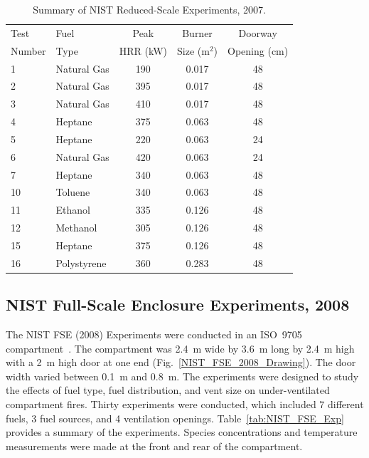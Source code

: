 \begin{table}[!ht]
\caption{Summary of NIST Reduced-Scale Experiments, 2007.}
\begin{center}
\begin{tabular}{|l|l|c|c|c|}
\hline
Test   &  Fuel         &  Peak        &  Burner       &  Doorway          \\
Number &  Type         &  HRR (kW)    &  Size (m$^2$) &  Opening (cm)     \\ \hline \hline
1      &  Natural Gas  &  190         &  0.017        &  48               \\ \hline
2      &  Natural Gas  &  395         &  0.017        &  48               \\ \hline
3      &  Natural Gas  &  410         &  0.017        &  48               \\ \hline
4      &  Heptane      &  375         &  0.063        &  48               \\ \hline
5      &  Heptane      &  220         &  0.063        &  24               \\ \hline
6      &  Natural Gas  &  420         &  0.063        &  24               \\ \hline
7      &  Heptane      &  340         &  0.063        &  48               \\ \hline
10     &  Toluene      &  340         &  0.063        &  48               \\ \hline
11     &  Ethanol      &  335         &  0.126        &  48               \\ \hline
12     &  Methanol     &  305         &  0.126        &  48               \\ \hline
15     &  Heptane      &  375         &  0.126        &  48               \\ \hline
16     &  Polystyrene  &  360         &  0.283        &  48               \\ \hline
\end{tabular}
\end{center}
\label{tab:NIST_RSE_Exp}
\end{table}


\subsection{NIST Full-Scale Enclosure Experiments, 2008}

The NIST FSE (2008) Experiments were conducted in an ISO~9705 compartment~\cite{Lock:1}. The compartment was 2.4~m wide by 3.6~m long by 2.4~m high with a 2~m high door at one end (Fig.~\ref{NIST_FSE_2008_Drawing}). The door width varied between 0.1~m and 0.8~m. The experiments were designed to study the effects of fuel type, fuel distribution, and vent size on under-ventilated compartment fires. Thirty experiments were conducted, which included 7 different fuels, 3 fuel sources, and 4 ventilation openings. Table~\ref{tab:NIST_FSE_Exp} provides a summary of the experiments. Species concentrations and temperature measurements were made at the front and rear of the compartment.

